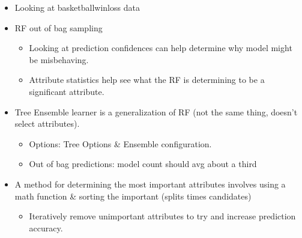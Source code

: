 
\begin{itemize}
  \item Looking at basketballwinloss data
  \item RF out of bag sampling
        \begin{itemize}
          \item Looking at prediction confidences can help determine why model might be misbehaving.
          \item Attribute statistics help see what the RF is determining to be a significant attribute.
        \end{itemize}
  \item Tree Ensemble learner is a generalization of RF (not the same thing, doesn't select attributes).
        \begin{itemize}
          \item Options: Tree Options \& Ensemble configuration.
          \item Out of bag predictions: model count should avg about a third
        \end{itemize}
  \item A method for determining the most important attributes involves using a math function \& sorting the important (splits times candidates)
        \begin{itemize}
          \item Iteratively remove unimportant attributes to try and increase prediction accuracy.
        \end{itemize}
\end{itemize}
